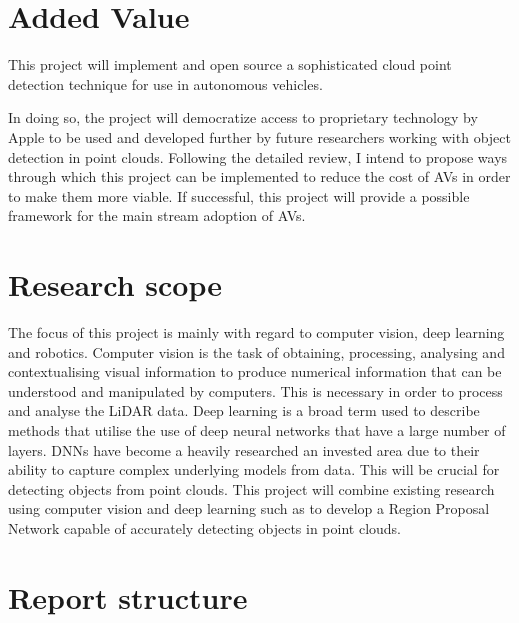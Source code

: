 \section{Added Value}

This project will implement and open source a sophisticated cloud point detection technique for use in autonomous vehicles.

In doing so, the project will democratize access to proprietary technology by Apple \cite{zhou2017voxelnet} to be used and developed further by future researchers working with object detection in point clouds.
Following the detailed review, I intend to propose ways through which this project can be implemented to reduce the cost of AVs in order to make them more viable. 
If successful, this project will provide a possible framework for the main stream adoption of AVs. 

\section{Research scope}
The focus of this project is mainly with regard to computer vision, deep learning and robotics. Computer vision is the task of obtaining, processing, analysing and contextualising visual information to produce numerical information that can be understood and manipulated by computers. This is necessary in order to process and analyse the LiDAR data. Deep learning is a broad term used to describe methods that utilise the use of deep neural networks that have a large number of layers. DNNs have become a heavily researched an invested area due to their ability to capture complex underlying models from data. This will be crucial for detecting objects from point clouds. 
This project will combine existing research using computer vision and deep learning such as \cite{qi2017pointnet}\cite{zhou2017voxelnet} to develop a Region Proposal Network capable of accurately detecting objects in point clouds. 

\section{Report structure}




